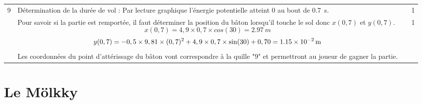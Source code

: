 \documentclass[a4paper,11pt,fleqn]{article}%
\begin{document}
\begin{longtable}{|c|m{.7\linewidth}|c|c|}
    9 & Détermination de la durée de vol : Par lecture graphique l'énergie potentielle atteint $0$ au bout de \SI{0.7}{s}.
    & & 1\\
    & Pour savoir si la partie est remportée, il faut déterminer la position du bâton lorsqu'il touche le sol donc $x(0,7)$ et $y(0,7)$. $$x(0,7) = 4,9 \times 0,7 \times cos(30) = \SI{2,97}{m}$$
    $$ y(0,7) = -0,5\times 9,81 \times (0,7)^2 + 4,9\times 0,7\times \sin(30)+0,70 = \SI{1,15E-2}{m}$$
    Les coordonnées du point d'attérissage du bâton vont correspondre à la quille "9" et permettront au joueur de gagner la partie.
    & & 1\\
    \hline
\end{longtable}

\section{Le Mölkky}
\end{document}

